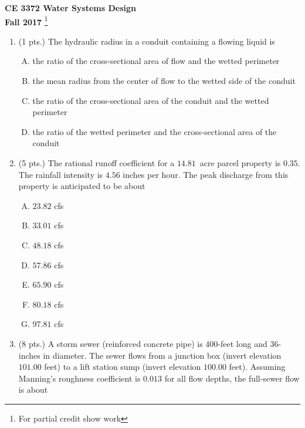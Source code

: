 \documentclass[11pt]{article}
\begin{document}
\begingroup
\begin{center}
{\textbf{{ CE 3372 Water Systems Design}  \\ Fall 2017} \footnote{For partial credit show work}
}
\end{center}
\endgroup


\begin{enumerate}
\item  (1 pts.)
The hydraulic radius in a conduit containing a flowing liquid is
\begin{enumerate} [(A)]
\item	the ratio of the cross-sectional area of flow and the wetted perimeter
\item	the mean radius from the center of flow to the wetted side of the conduit
\item	the ratio of the cross-sectional area of the conduit and the wetted perimeter
\item	the ratio of the wetted perimeter and the cross-sectional area of the conduit
\end{enumerate}
\item (5 pts.)
The rational runoff coefficient for a $14.81$~acre parcel property is $0.35$.  
The rainfall intensity is $4.56$ inches per hour.  
The peak discharge from this property is anticipated to be about
\begin{enumerate} [(A)]
\item $23.82$ cfs
\item $33.01$ cfs
\item $48.18$ cfs
\item $57.86$ cfs
\item $65.90$ cfs
\item $80.18$ cfs
\item $97.81$ cfs
\end{enumerate}
\item  (8 pts.)
A storm sewer (reinforced concrete pipe) is 400-feet long and 36-inches in diameter.  The sewer flows from a junction box (invert elevation $101.00$ feet) to a lift station sump (invert elevation $100.00$ feet).  Assuming Manning's roughness coefficient is $0.013$ for all flow depths, the full-sewer flow is about%

\end{enumerate}
\end{document}
